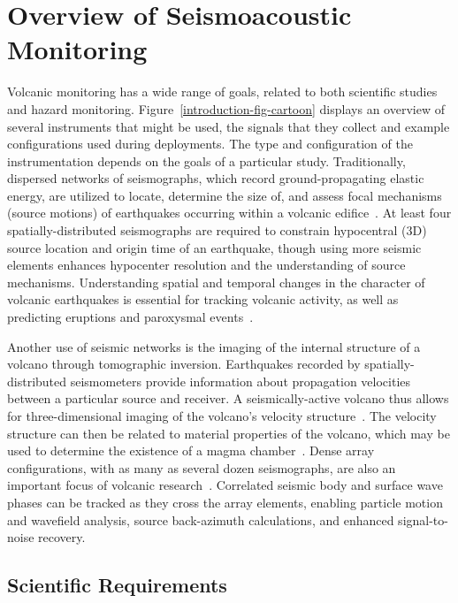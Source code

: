 \section{Overview of Seismoacoustic Monitoring}

Volcanic monitoring has a wide range of goals, related to both scientific
studies and hazard monitoring. Figure~\ref{introduction-fig-cartoon} displays
an overview of several instruments that might be used, the signals that they
collect and example configurations used during deployments. The type and
configuration of the instrumentation depends on the goals of a particular
study. Traditionally, dispersed networks of seismographs, which record
ground-propagating elastic energy, are utilized to locate, determine the size
of, and assess focal mechanisms (source motions) of earthquakes occurring
within a volcanic edifice~\cite{Chouet03}. At least four
spatially-distributed seismographs are required to constrain hypocentral (3D)
source location and origin time of an earthquake, though using more seismic
elements enhances hypocenter resolution and the understanding of source
mechanisms. Understanding spatial and temporal changes in the character of
volcanic earthquakes is essential for tracking volcanic activity, as well as
predicting eruptions and paroxysmal events~\cite{McNutt96}. 

Another use of seismic networks is the imaging of the internal structure of a
volcano through tomographic inversion. Earthquakes recorded by
spatially-distributed seismometers provide information about propagation
velocities between a particular source and receiver. A seismically-active
volcano thus allows for three-dimensional imaging of the volcano's velocity
structure~\cite{Benz96,Phillips91}. The velocity structure can then be
related to material properties of the volcano, which may be used to determine
the existence of a magma chamber~\cite{Lees89,Moran99}. Dense array
configurations, with as many as several dozen seismographs, are also an
important focus of volcanic research~\cite{Dietel89,Neuberg94}. Correlated
seismic body and surface wave phases can be tracked as they cross the array
elements, enabling particle motion and wavefield analysis, source
back-azimuth calculations, and enhanced signal-to-noise recovery.

\subsection{Scientific Requirements}

